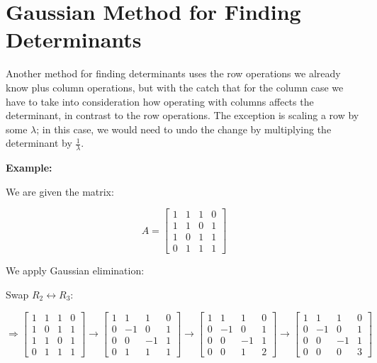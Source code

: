 \section{Gaussian Method for Finding Determinants}

Another method for finding determinants uses the row operations we already know plus column operations,
but with the catch that for the column case we have to take into consideration how
operating with columns affects the determinant, in contrast to the row operations. The exception is scaling
a row by some \(\lambda\); in this case, we would need to undo the change by multiplying the determinant
by \(\frac{1}{\lambda}\).

\textbf{Example: }

We are given the matrix:

\[
    A = \begin{bmatrix}
        1 & 1 & 1 & 0 \\
        1 & 1 & 0 & 1 \\
        1 & 0 & 1 & 1 \\
        0 & 1 & 1 & 1
    \end{bmatrix}
\]

We apply Gaussian elimination:

Swap \( R_2 \leftrightarrow R_3 \):

\[
    \Rightarrow
    \begin{bmatrix}
        1 & 1 & 1 & 0 \\
        1 & 0 & 1 & 1 \\
        1 & 1 & 0 & 1 \\
        0 & 1 & 1 & 1
    \end{bmatrix}
    \rightarrow
    \begin{bmatrix}
        1 & 1  & 1  & 0 \\
        0 & -1 & 0  & 1 \\
        0 & 0  & -1 & 1 \\
        0 & 1  & 1  & 1
    \end{bmatrix}
    \rightarrow
    \begin{bmatrix}
        1 & 1  & 1  & 0 \\
        0 & -1 & 0  & 1 \\
        0 & 0  & -1 & 1 \\
        0 & 0  & 1  & 2
    \end{bmatrix}
    \rightarrow
    \begin{bmatrix}
        1 & 1  & 1  & 0 \\
        0 & -1 & 0  & 1 \\
        0 & 0  & -1 & 1 \\
        0 & 0  & 0  & 3
    \end{bmatrix}
\]

